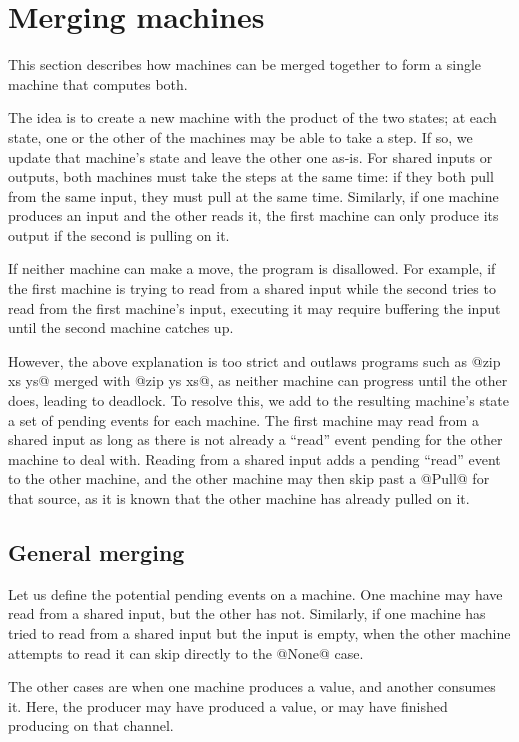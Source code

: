 \section{Merging machines}
\label{s:Merging}

This section describes how machines can be merged together to form a single machine that computes both.

The idea is to create a new machine with the product of the two states; at each state, one or the other of the machines may be able to take a step.
If so, we update that machine's state and leave the other one as-is.
For shared inputs or outputs, both machines must take the steps at the same time: if they both pull from the same input, they must pull at the same time.
Similarly, if one machine produces an input and the other reads it, the first machine can only produce its output if the second is pulling on it.

If neither machine can make a move, the program is disallowed.
For example, if the first machine is trying to read from a shared input while the second tries to read from the first machine's input, executing it may require buffering the input until the second machine catches up.

However, the above explanation is too strict and outlaws programs such as @zip xs ys@ merged with @zip ys xs@, as neither machine can progress until the other does, leading to deadlock.
To resolve this, we add to the resulting machine's state a set of pending events for each machine.
The first machine may read from a shared input as long as there is not already a ``read'' event pending for the other machine to deal with.
Reading from a shared input adds a pending ``read'' event to the other machine, and the other machine may then skip past a @Pull@ for that source, as it is known that the other machine has already pulled on it.

\subsection{General merging}
Let us define the potential pending events on a machine.
One machine may have read from a shared input, but the other has not.
Similarly, if one machine has tried to read from a shared input but the input is empty, when the other machine attempts to read it can skip directly to the @None@ case.

The other cases are when one machine produces a value, and another consumes it.
Here, the producer may have produced a value, or may have finished producing on that channel.

